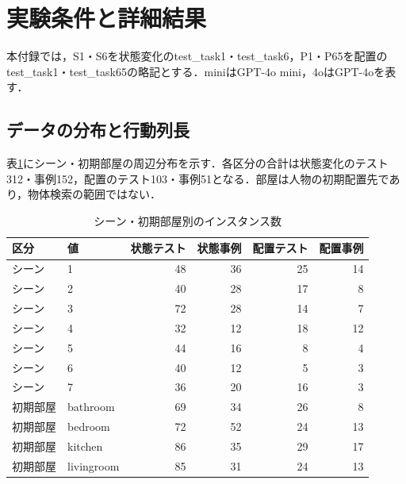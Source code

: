\section{実験条件と詳細結果}\label{app:evaluation}
本付録では，S1・S6を状態変化のtest\_task1・test\_task6，P1・P65を配置のtest\_task1・test\_task65の略記とする．miniはGPT-4o mini，4oはGPT-4oを表す．

\subsection{データの分布と行動列長}
表\ref{tab:coverage_internal}にシーン・初期部屋の周辺分布を示す．各区分の合計は状態変化のテスト312・事例152，配置のテスト103・事例51となる．部屋は人物の初期配置先であり，物体検索の範囲ではない．
\begin{table}[tb]
\caption{シーン・初期部屋別のインスタンス数}\label{tab:coverage_internal}
\centering\small
\setlength{\tabcolsep}{3pt}
\begin{tabular}{llrrrr}
\hline
区分 & 値 & 状態テスト & 状態事例 & 配置テスト & 配置事例 \\
\hline
シーン & 1 & 48 & 36 & 25 & 14 \\
シーン & 2 & 40 & 28 & 17 & 8 \\
シーン & 3 & 72 & 28 & 14 & 7 \\
シーン & 4 & 32 & 12 & 18 & 12 \\
シーン & 5 & 44 & 16 & 8 & 4 \\
シーン & 6 & 40 & 12 & 5 & 3 \\
シーン & 7 & 36 & 20 & 16 & 3 \\
初期部屋 & bathroom & 69 & 34 & 26 & 8 \\
初期部屋 & bedroom & 72 & 52 & 24 & 13 \\
初期部屋 & kitchen & 86 & 35 & 29 & 17 \\
初期部屋 & livingroom & 85 & 31 & 24 & 13 \\
\hline
\end{tabular}
\end{table}

